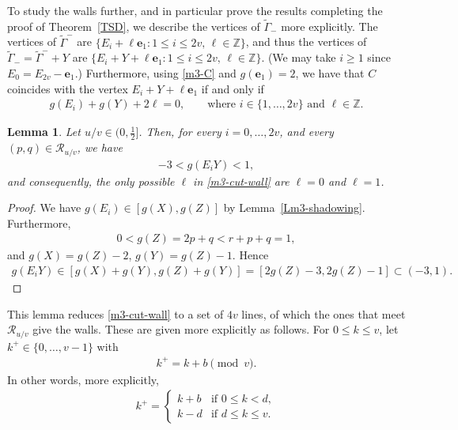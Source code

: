 \documentclass[11pt,reqno,tbtags,a4paper]{amsart}
\numberwithin{equation}{section}
\renewcommand\le{\leq}
\renewcommand\ge{\geq}
\renewcommand\leq{\leqslant}
\renewcommand\geq{\geqslant}
\theoremstyle{plain}%
\newtheorem{lemma}[theorem]{Lemma}
\theoremstyle{definition}
\theoremstyle{remark}
\newcounter{cases}
\newcommand{\refT}[1]{Theorem~\ref{#1}}
\newcommand{\refL}[1]{Lemma~\ref{#1}}
\newcommand\set[1]{\ensuremath{\{#1\}}}
\newcommand\bbZ{\mathbb Z}
\newcommand\gG{\Gamma}
\newcommand\cR{{\mathcal R}}
\newcommand\ve{\mathbf{e}}
\newcommand\tgG{\widetilde{\gG}}
\newcommand\kx{{k^+}}
\newcommand\0{{\boldsymbol 0}}
\newcommand\1{{\boldsymbol 1}}
\begin{document}
To study the walls further, and in particular prove the results
completing the proof of \refT{TSD},
we describe the vertices of $\tgG_-$ more explicitly.
The vertices of $\tgG^-$ are 
\set{E_i+\ell\ve_1:1\le i\le 2v,\,\ell\in\bbZ},
and thus the vertices of $\tgG_-=\tgG^-+Y$ are
\set{E_i+Y+\ell\ve_1:1\le i\le 2v,\,\ell\in\bbZ}.
(We may take $i\ge1$ since $E_0=E_{2v}-\ve_1$.)
Furthermore, using \eqref{m3-C} and $g(\ve_1)=2$, 
we have 
that $C$ coincides with the vertex
$E_i+Y+\ell\ve_1$ if and only if
\begin{align}\label{m3-cut-wall}
  g(E_i)+g(Y)+2\ell=0,
\qquad \text{where $i\in\set{1,\dots,2v}$ and $\ell\in\bbZ$}.
\end{align}


\begin{lemma}\label{LW1}
Let $u/v\in(0,\frac12]$. 
Then, for every $i=0,\dots,2v$,
and every $(p,q)\in\cR_{u/v}$, we have
  \begin{align}\label{lw1}
    -3 < g(E_iY)<1,
  \end{align}
and  consequently,
the only possible $\ell$ in \eqref{m3-cut-wall} are $\ell=0$ and $\ell=1$.
\end{lemma}
\begin{proof}
We have $g(E_i)\in [g(X),g(Z)]$ by \refL{Lm3-shadowing}.
Furthermore, 
\begin{align}\label{lw1a}
  0<g(Z)=2p+q < r+p+q=1,
\end{align}
and $g(X)=g(Z)-2$, $g(Y)=g(Z)-1$. Hence
\begin{align}\label{lw1b}
  g(E_iY)\in[g(X)+g(Y),g(Z)+g(Y)]
=[2g(Z)-3,2g(Z)-1]
\subset(-3,1).
\end{align}
\end{proof}

This lemma reduces \eqref{m3-cut-wall} 
to a set of $4v$ lines, of which the ones that
meet $\cR_{u/v}$ give the walls.
These are given more explicitly as follows.
%
For $0\le k\le v$, let $\kx\in\set{0,\dots,v-1}$ with
\begin{align}\label{kx}
  \kx=k+b\pmod v.
\end{align}
In other words, more explicitly,
\begin{align}\label{kx2}
  \kx=
  \begin{cases}
    k+b&\text{if }0\le k<d,
\\
    k-d&\text{if }d\le k\le v.
  \end{cases}
\end{align}
%
%
\end{document}
